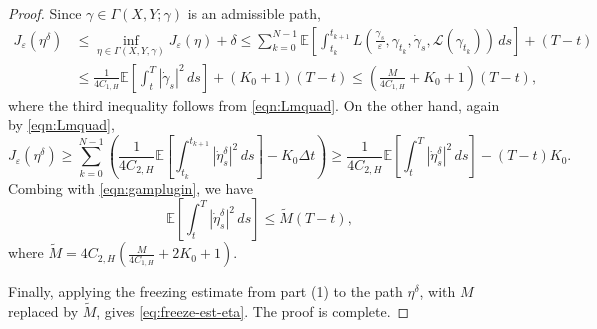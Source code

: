 \documentclass[10pt,a4paper]{amsart}
\newcommand{\e}{\varepsilon}
\newcommand{\ep}{\varepsilon}
\begin{document}
\begin{proof}
Since $\gamma \in \Gamma(X,Y; \gamma)$ is an admissible path,
\begin{equation}\label{eqn:gamplugin}
\begin{aligned}
    J_\ep(\eta^\delta) &\leq \inf_{\eta\in \Gamma(X,Y,\gamma)}
J_\ep(\eta)+\delta \leq \sum_{k=0}^{N-1}
\mathbb E \left[
\int_{t_k}^{t_{k+1}} L \left(
\frac{\gamma_s}{\varepsilon},\gamma_{t_k},
\dot{\gamma}_s,
\mathcal{L}(\gamma_{t_k})
\right)\,ds\right] +(T-t)\\
& \leq \frac{1}{4C_{1,H}} \mathbb{E}
\left[\int_{t}^{T} \left|\dot{\gamma}_s\right|^2\,ds\right]+(K_0+1)(T-t) \leq \left(\frac{M}{4C_{1,H}}+K_0+1\right)(T-t),
\end{aligned}
\end{equation}
where the third inequality follows from \eqref{eqn:Lmquad}. On the other hand, again by \eqref{eqn:Lmquad},
\[
J_\ep (\eta^\delta) \geq \sum_{k=0}^{N-1} \left(\frac{1}{4C_{2,H}}
\mathbb{E} \left[
\int_{t_k}^{t_{k+1}}  \left|\dot{\eta}^\delta_s \right|^2 \,ds \right] - K_0  \Delta t\right) \geq \frac{1}{4C_{2,H}} \mathbb{E}
\left[\int_t^{T}  \left|\dot{\eta}^\delta_s\right|^2 \,ds\right]-(T-t)K_0.
\]
Combing with \eqref{eqn:gamplugin}, we have
\[
\mathbb{E}
\left[\int_{t}^{T} \left|\dot{\eta}^\delta_s\right|^2 \,ds \right] \leq \tilde{M}(T-t),
\]
where $\tilde{M}=4C_{2,H}
\left(
\frac{M}{4C_{1,H}}+2K_0+1
\right)$.

Finally, applying the freezing estimate from part {\rm (1)} to the path $\eta^\delta$, with $M$ replaced by $\tilde{M}$, gives \eqref{eq:freeze-est-eta}. The proof is complete.
\end{proof}
\end{document}
